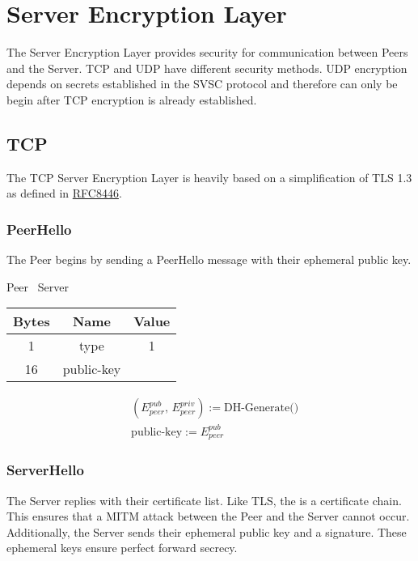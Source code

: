 \section{Server Encryption Layer}

The Server Encryption Layer provides security for communication between Peers and the Server. TCP and UDP have
different security methods. UDP encryption depends on secrets established in the SVSC protocol and therefore can only
be begin after TCP encryption is already established.

\subsection{TCP}

The TCP Server Encryption Layer is heavily based on a simplification of TLS 1.3 as defined in
\href{https://datatracker.ietf.org/doc/html/rfc8446}{RFC8446}.

\subsubsection{PeerHello}

The Peer begins by sending a PeerHello message with their ephemeral public key.

\begin{center}
    Peer \textrightarrow\ Server\\
    \begin{tabular}{|c|c|c|}
        \hline
        \textbf{Bytes} & \textbf{Name} & \textbf{Value} \\
        \hline
        1              & type          & 1              \\
        \hline
        16             & public-key    &                \\
        \hline
    \end{tabular}
\end{center}

\begin{align*}
    &(E_{peer}^{pub},\,E_{peer}^{priv}) := \text{DH-Generate()}\\
    &\text{public-key} := E_{peer}^{pub}
\end{align*}

\subsubsection{ServerHello}

The Server replies with their certificate list. Like TLS, the is a certificate chain. This ensures that a MITM attack
between the Peer and the Server cannot occur. Additionally, the Server sends their ephemeral public key and a
signature. These ephemeral keys ensure perfect forward secrecy.

